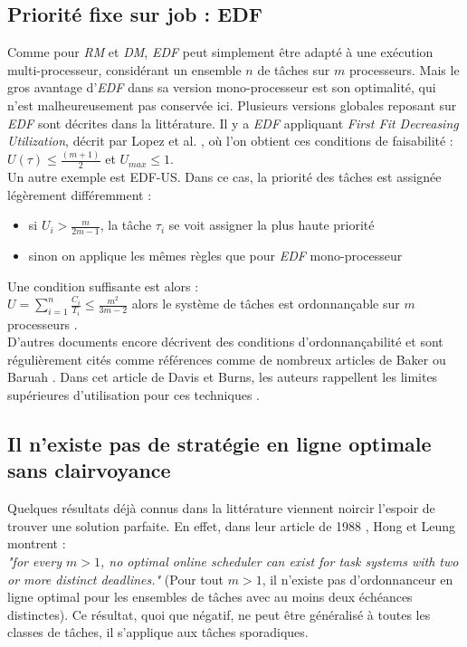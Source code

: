 \documentclass[11pt,a4paper,oneside]{report}
\begin{document}
\subsection{Priorité fixe sur job : EDF}
Comme pour \textit{RM} et \textit{DM}, \textit{EDF} peut simplement être adapté à une exécution multi-processeur, 
considérant un ensemble $n$ de tâches sur $m$ processeurs. Mais le gros avantage d'\textit{EDF} 
dans sa version mono-processeur est son optimalité, qui n'est malheureusement pas conservée ici. 
Plusieurs versions globales reposant sur \textit{EDF} sont décrites dans la littérature. 
Il y a \textit{EDF} appliquant \textit{First Fit Decreasing Utilization}, décrit par 
Lopez et al. \cite{lopez_utilization_2004}, où l'on obtient ces conditions de faisabilité : \\
$U(\tau) \leq \frac{(m + 1)}{2}$ et $U_{max} \leq 1$. \\
Un autre exemple est EDF-US. 
Dans ce cas, la priorité des tâches est assignée légèrement différemment :\\
\begin{itemize}
	\item si $U_i > \frac{m}{2m-1}$, la tâche $\tau_i$ se voit assigner la plus haute priorité
	\item sinon on applique les mêmes règles que pour \textit{EDF} mono-processeur
\end{itemize}
Une condition suffisante est alors :\\
$U = \sum_{i=1}^{n}\frac{C_i}{T_i} \leq \frac{m^2}{3m-2}$
alors le système de tâches est ordonnançable sur $m$ processeurs
\cite{andersson_static-priority_2001}. \\
D'autres documents encore décrivent des conditions d'ordonnançabilité et sont régulièrement 
cités comme références comme de nombreux articles de Baker 
\cite{baker_multiprocessor_2003} \cite{baker_analysis_2005} ou Baruah \cite{baruah_optimal_2004}
\cite{baruah_schedulability_2008}. 
Dans cet article de Davis et Burns, les auteurs rappellent les 
limites supérieures d'utilisation pour ces techniques \cite{davis_survey_2011}.

\subsection{Il n'existe pas de stratégie en ligne optimale sans clairvoyance}
Quelques résultats déjà connus dans la littérature viennent noircir l'espoir de trouver une 
solution parfaite. En effet, dans leur article de 1988 \cite{hong_-line_1988}, Hong et Leung montrent :\\
\textit{"for every $m > 1$, no optimal online scheduler can exist for task systems with two or more distinct
	deadlines."} (Pour tout $m > 1$, il n'existe pas d'ordonnanceur en ligne 
optimal pour les ensembles de tâches avec au moins deux échéances distinctes). 
Ce résultat, quoi que négatif, ne peut être généralisé à toutes les classes de tâches, il s'applique 
aux tâches sporadiques. 
\end{document}
